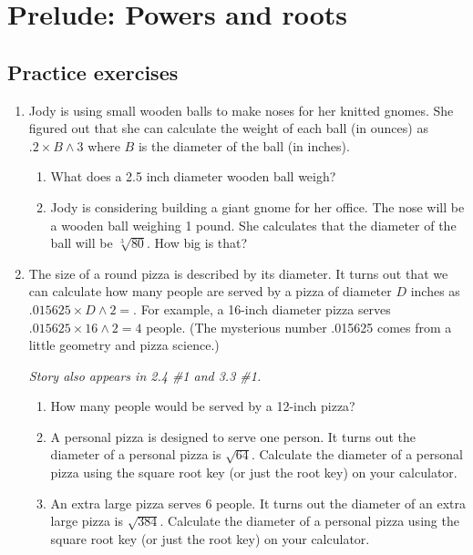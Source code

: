 
\section{Prelude: Powers and roots} 

\subsection*{Practice exercises}

\begin{enumerate}

\item Jody is using small wooden balls to make noses for her knitted gnomes.  She figured out that she can calculate the weight of each ball (in ounces) as $.2 \times B \land 3$ where $B$ is the diameter of the ball (in inches).\begin{enumerate}
\item 
What does a 2.5 inch diameter wooden ball weigh? \vfill
\item Jody is considering building a giant gnome for her office.  The nose will be a wooden ball weighing 1 pound.  She calculates that the diameter of the ball will be $\sqrt[3]{80}$.  How big is that? \vfill
\end{enumerate}

\item The size of a round pizza is described by its diameter.  It turns out that we can calculate how many people are served by a pizza of diameter $D$ inches as $.015625 \times D \land 2=$.  For example, a 16-inch diameter pizza serves $.015625 \times 16 \land 2 = 4$ people.  (The mysterious number .015625 comes from a little geometry and pizza science.)

\hfill \emph{Story also appears in 2.4 \#1 and 3.3 \#1.}
\begin{enumerate}
\item How many people would be served by a 12-inch pizza? \vfill
\item A personal pizza is designed to serve one person.  It turns out the diameter of a personal pizza is $\sqrt{64}$.  Calculate the diameter of a personal pizza using the square root key (or just the root key) on your calculator. \vfill
\item An extra large pizza serves 6 people.  It turns out the diameter of an extra large pizza is $\sqrt{384}$.  Calculate the diameter of a personal pizza using the square root key (or just the root key) on your calculator. \vfill
\end{enumerate}


\end{enumerate}
